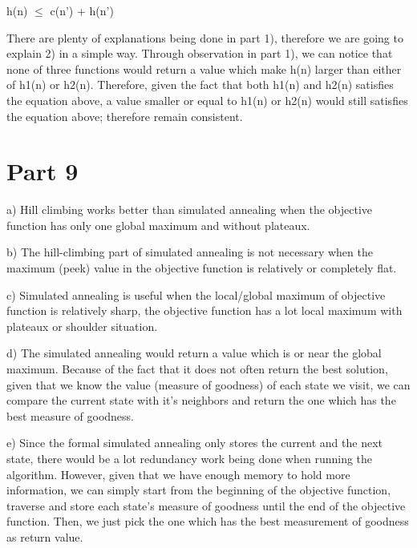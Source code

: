 \documentclass{article}
\begin{document}
\begin{center}

h{\small(n)} $\le$ c{\small(n')} + h{\small(n')}

\end{center}

There are plenty of explanations being done in part 1), therefore we are going to explain 2) in a simple way. Through observation in part 1), we can notice that none of three functions would return a value which make h{\small(n)} larger than either of h{\small1(n)} or h{\small2(n)}. Therefore, given the fact that both h{\small 1(n)} and h{\small 2(n)} satisfies the equation above, a value smaller or equal to h{\small 1(n)} or h{\small 2(n)} would still satisfies the equation above; therefore remain consistent.

\section*{Part 9}

\hspace{5mm} 

a) Hill climbing works better than simulated annealing when the objective function has only one global maximum and without plateaux.

b) The hill-climbing part of simulated annealing is not necessary when the maximum (peek) value in the objective function is relatively or completely flat.

c) Simulated annealing is useful when the local/global maximum of objective function is relatively sharp, the objective function has a lot local maximum with plateaux or shoulder situation.

d) The simulated annealing would return a value which is or near the global maximum. Because of the fact that it does not often return the best solution, given that we know the value (measure of goodness) of each state we visit, we can compare the current state with it's neighbors and return the one which has the best measure of goodness.

e) Since the formal simulated annealing only stores the current and the next state, there would be a lot redundancy work being done when running the algorithm. However, given that we have enough memory to hold more information, we can simply start from the beginning of the objective function, traverse and store each state's measure of goodness until the end of the objective function. Then, we just pick the one which has the best measurement of goodness as return value.
\end{document}
